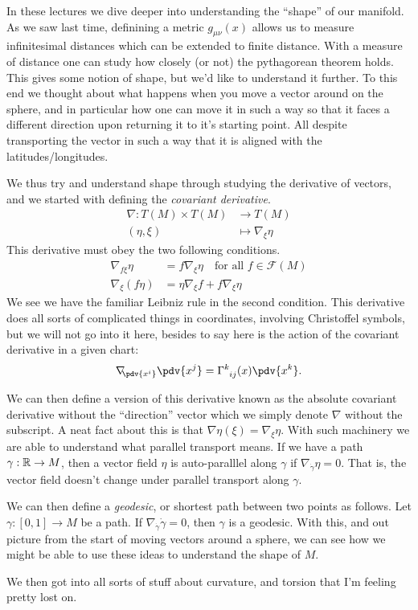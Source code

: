 \documentclass{homework}
\begin{document}
In these lectures we dive deeper into understanding the ``shape'' of our manifold.
As we saw last time, definining a metric $g_{\mu\nu}(x)$ allows us to measure infinitesimal distances which can be extended to finite distance.
With a measure of distance one can study how closely (or not) the pythagorean theorem holds.
This gives some notion of shape, but we'd like to understand it further.
To this end we thought about what happens when you move a vector around on the sphere, and in particular how one can move it in such a way so that it faces a different direction upon returning it to it's starting point.
All despite transporting the vector in such a way that it is aligned with the latitudes/longitudes.

We thus try and understand shape through studying the derivative of vectors, and we started with defining the \emph{covariant derivative}.
\begin{align*}
	\nabla : T(M)\times T(M) & \longrightarrow T(M)       \\
	(\eta, \xi)              & \longmapsto \nabla_\xi\eta
\end{align*}
This derivative must obey the two following conditions.
\begin{align*}
	\nabla_{f\xi}\eta & = f\nabla_\xi\eta \quad \text{for all }f\in\mathcal{F}(M) \\
	\nabla_\xi(f\eta) & = \eta \nabla_\xi f + f\nabla_\xi\eta
\end{align*}
We see we have the familiar Leibniz rule in the second condition.
This derivative does all sorts of complicated things in coordinates, involving Christoffel symbols, but we will not go into it here, besides to say here is the action of the covariant derivative in a given chart:
\begin{equation*}
	\nabla_{\!\!\pdv{x^i}}\pdv{x^j} = \Gamma^k_{\phantom{k}ij}(x)\pdv{x^k}.
\end{equation*}

We can then define a version of this derivative known as the absolute covariant derivative without the ``direction'' vector which we simply denote $\nabla$ without the subscript.
A neat fact about this is that $\nabla\eta(\xi) = \nabla_\xi\eta$.
With such machinery we are able to understand what parallel transport means.
If we have a path $\gamma:\mathbb{R}\to M$, then a vector field $\eta$ is auto-paralllel along $\gamma$ if $\nabla_{\dot{\gamma}}\eta = 0$.
That is, the vector field doesn't change under parallel transport along $\gamma$.

We can then define a \emph{geodesic}, or shortest path between two points as follows.
Let $\gamma:[0,1] \to M$ be a path.
If $\nabla_{\dot{\gamma}}\dot{\gamma} = 0$, then $\gamma$ is a geodesic.
With this, and out picture from the start of moving vectors around a sphere, we can see how we might be able to use these ideas to understand the shape of $M$.

We then got into all sorts of stuff about curvature, and torsion that I'm feeling pretty lost on.
\end{document}
